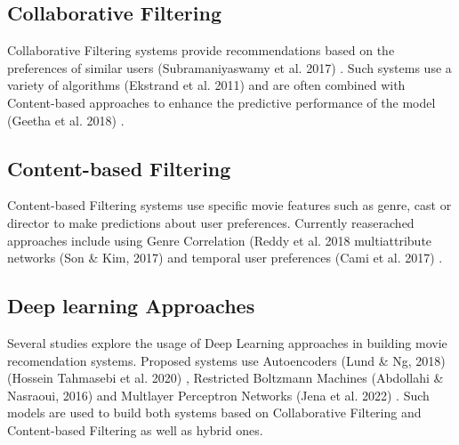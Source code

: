 \subsection{Collaborative Filtering}
Collaborative Filtering systems provide recommendations based on the preferences of similar users (Subramaniyaswamy et al. 2017) \cite{doi:10.1504/IJHPCN.2017.083199}. Such systems use a variety of algorithms (Ekstrand et al. 2011) \cite{HCI-009} and are often combined with Content-based approaches to enhance the predictive performance of the model (Geetha et al. 2018) \cite{Geetha_2018}.

\subsection{Content-based Filtering}
Content-based Filtering systems use specific movie features such as genre, cast or director to make predictions about user preferences. Currently reaserached approaches include using Genre Correlation (Reddy et al. 2018 \cite{10.1007/978-981-13-1927-3_42} multiattribute networks (Son \& Kim, 2017) \cite{SON2017404} and temporal user preferences (Cami et al. 2017) \cite{8311601}.

\subsection{Deep learning Approaches}
Several studies explore the usage of Deep Learning approaches in building movie recomendation systems. Proposed systems use Autoencoders (Lund \& Ng, 2018) \cite{8424686} (Hossein Tahmasebi et al. 2020) \cite{Tahmasebi2021}, Restricted Boltzmann Machines (Abdollahi \& Nasraoui, 2016) \cite{abdollahi2016explainable} and Multlayer Perceptron Networks (Jena et al. 2022) \cite{Jena2022}. Such models are used to build both systems based on Collaborative Filtering and Content-based Filtering as well as hybrid ones.